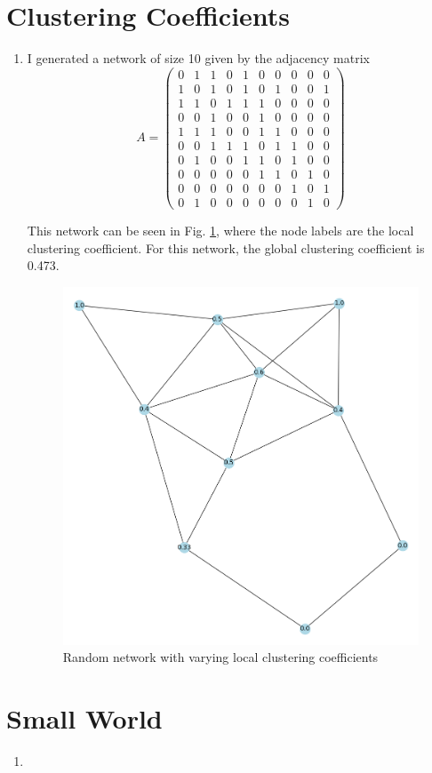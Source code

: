 \documentclass[a4paper]{article}
\begin{document}
\pagebreak

\section{Clustering Coefficients}

\begin{enumerate}[label={(4. \alph*)}]    
     \item 
         I generated a network of size 10 given by the adjacency matrix
\begin{equation*}
    A = 
    \begin{pmatrix} 
        0 & 1 & 1 & 0 & 1 & 0 & 0 & 0 & 0 & 0\\
        1 & 0 & 1 & 0 & 1 & 0 & 1 & 0 & 0 & 1\\
        1 & 1 & 0 & 1 & 1 & 1 & 0 & 0 & 0 & 0\\
        0 & 0 & 1 & 0 & 0 & 1 & 0 & 0 & 0 & 0\\
        1 & 1 & 1 & 0 & 0 & 1 & 1 & 0 & 0 & 0\\
        0 & 0 & 1 & 1 & 1 & 0 & 1 & 1 & 0 & 0\\
        0 & 1 & 0 & 0 & 1 & 1 & 0 & 1 & 0 & 0\\
        0 & 0 & 0 & 0 & 0 & 1 & 1 & 0 & 1 & 0\\
        0 & 0 & 0 & 0 & 0 & 0 & 0 & 1 & 0 & 1\\
        0 & 1 & 0 & 0 & 0 & 0 & 0 & 0 & 1 & 0
    \end{pmatrix} 
\end{equation*}
    


    This network can be seen in Fig. \ref{fig:small_clustering}, where the node labels are the local clustering coefficient. For this network, the global clustering coefficient is 0.473. 


    \begin{figure}[h]
        \centerline{\includegraphics[width=0.5\linewidth]{./small_clustering.png}}
        \caption{Random network with varying local clustering coefficients}
        \label{fig:small_clustering}
    \end{figure}

\end{enumerate}

\pagebreak

\section{Small World}

\begin{enumerate}[label={(5. \alph*)}]
    \item

\end{enumerate}


\end{document}
